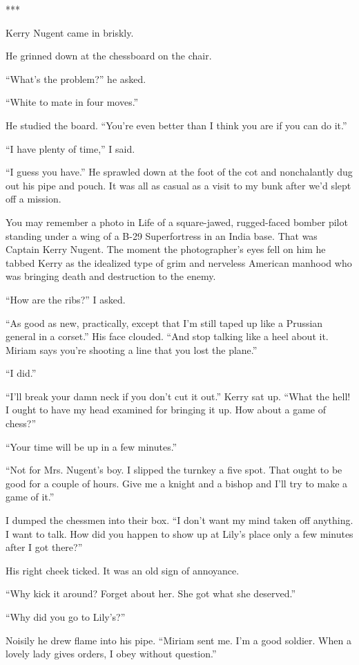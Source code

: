 \documentclass{novel}
\begin{document}
***

Kerry Nugent came in briskly.

He grinned down at the chessboard on the chair.

“What’s the problem?” he asked.

“White to mate in four moves.”

He studied the board. “You’re even better than I think you are if you can do it.”

“I have plenty of time,” I said.

“I guess you have.” He sprawled down at the foot of the cot and nonchalantly dug out his pipe and pouch. It was all as casual as a visit to my bunk after we’d slept off a mission.

You may remember a photo in Life of a square-jawed, rugged-faced bomber pilot standing under a wing of a B-29 Superfortress in an India base. That was Captain Kerry Nugent. The moment the photographer’s eyes fell on him he tabbed Kerry as the idealized type of grim and nerveless American manhood who was bringing death and destruction to the enemy.

“How are the ribs?” I asked.

“As good as new, practically, except that I’m still taped up like a Prussian general in a corset.” His face clouded. “And stop talking like a heel about it. Miriam says you’re shooting a line that you lost the plane.”

“I did.”

“I’ll break your damn neck if you don’t cut it out.” Kerry sat up. “What the hell! I ought to have my head examined for bringing it up. How about a game of chess?”

“Your time will be up in a few minutes.”

“Not for Mrs. Nugent’s boy. I slipped the turnkey a five spot. That ought to be good for a couple of hours. Give me a knight and a bishop and I’ll try to make a game of it.”

I dumped the chessmen into their box. “I don’t want my mind taken off anything. I want to talk. How did you happen to show up at Lily’s place only a few minutes after I got there?”

His right cheek ticked. It was an old sign of annoyance.

“Why kick it around? Forget about her. She got what she deserved.”

“Why did you go to Lily’s?”

Noisily he drew flame into his pipe. “Miriam sent me. I’m a good soldier. When a lovely lady gives orders, I obey without question.”
\end{document}
